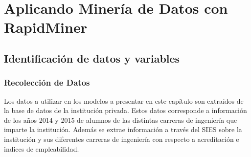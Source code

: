 \chapter[Aplicando Minería de Datos con RapidMiner]{Aplicando Minería de Datos con RapidMiner}
\label{ch:desmin}

\section{Identificación de datos y variables}
\subsection{Recolección de Datos}

Los datos a utilizar en los modelos a presentar en este capítulo son extraídos de la base de datos de la institución privada. Estos datos corresponde a información de los años 2014 y 2015 de alumnos de las distintas carreras de ingeniería que imparte la institución. Además se extrae información a través del SIES sobre la institución y sus diferentes carreras de ingeniería con respecto a acreditación e indices de empleabilidad.\\

